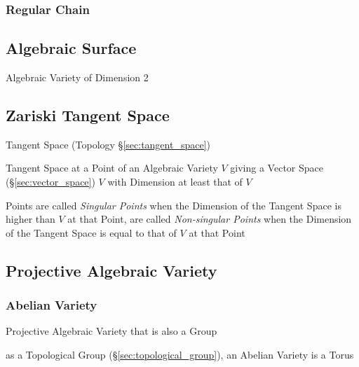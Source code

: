 \subsubsection{Regular Chain}\label{sec:regular_chain}



\subsection{Algebraic Surface}\label{sec:algebraic_surface}

Algebraic Variety of Dimension 2



\subsection{Zariski Tangent Space}\label{sec:zariski_space}

Tangent Space (Topology \S\ref{sec:tangent_space})

Tangent Space at a Point of an Algebraic Variety $V$ giving a Vector Space
(\S\ref{sec:vector_space}) $V$ with Dimension at least that of $V$

Points are called \emph{Singular Points} when the Dimension of the Tangent
Space is higher than $V$ at that Point, are called \emph{Non-singular Points}
when the Dimension of the Tangent Space is equal to that of $V$ at that Point



\subsection{Projective Algebraic Variety}
\label{sec:projective_algebraic_variety}

\subsubsection{Abelian Variety}\label{sec:abelian_variety}

Projective Algebraic Variety that is also a Group

as a Topological Group (\S\ref{sec:topological_group}), an Abelian Variety is a
Torus %



